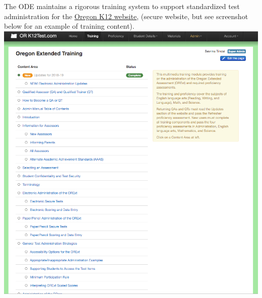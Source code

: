 \documentclass[]{article}
\begin{document}
The ODE maintains a rigorous training system to support standardized
test administration for the \color{link}
\href{https://or.k12test.com}{Oregon K12 website}\color{black}, (secure
website, but see screenshot below for an example of training content).
\FloatBarrier
\includegraphics{Figures/TrainingSite/TrainingSiteContentExample.png}
\end{document}
